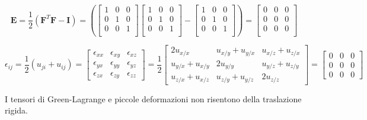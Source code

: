  \begin{equation*}
\boldsymbol{E} = \frac{1}{2} \left(\boldsymbol{F}^T \boldsymbol{F} - \boldsymbol{I}\right)
= \left(\begin{bmatrix}
   1 & 0 & 0 \\
   0 & 1 & 0 \\
   0 & 0 & 1 \\
\end{bmatrix} 
\begin{bmatrix}
   1 & 0 & 0 \\
   0 & 1 & 0 \\
   0 & 0 & 1 \\
\end{bmatrix} -
\begin{bmatrix}
   1 & 0 & 0 \\
   0 & 1 & 0 \\
   0 & 0 & 1 \\
\end{bmatrix}\right) =
\begin{bmatrix}
   0 & 0 & 0 \\
   0 & 0 & 0 \\
   0 & 0 & 0 \\
\end{bmatrix}
\end{equation*}

\begin{equation*}
\epsilon_{ij} = \frac{1}{2} \left( u_{ji} + u_{ij} \right)
= 
\begin{bmatrix}
\epsilon_{xx} & \epsilon_{xy} & \epsilon_{xz} \\
\epsilon_{yx} & \epsilon_{yy} & \epsilon_{yz} \\
\epsilon_{zx} & \epsilon_{zy} & \epsilon_{zz}
\end{bmatrix}
= 
\frac{1}{2}
\begin{bmatrix}
2 u_{x/x} & u_{x/y} + u_{y/x} & u_{x/z} + u_{z/x} \\
u_{y/x} + u_{x/y} & 2 u_{y/y} & u_{y/z} + u_{z/y} \\
u_{z/x} + u_{x/z} & u_{z/y} + u_{y/z} & 2 u_{z/z}
\end{bmatrix}
=
\begin{bmatrix}
0 & 0 & 0 \\
0 & 0 & 0 \\
0 & 0 & 0
\end{bmatrix}
\end{equation*}



I tensori di Green-Lagrange e piccole deformazioni non risentono della traslazione rigida.

